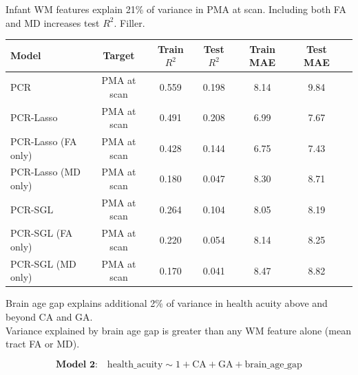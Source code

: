 \documentclass[final]{beamer}
\newlength{\colwidth}
\begin{document}
\begin{frame}[t]
\begin{columns}[t]
\begin{column}{\colwidth}
\begin{block}{Infant WM features explain 21\% of variance in PMA at scan. Including both FA and MD increases test $R^2$.}
    Filler. 
    \begin{table}[ht]
      \centering
      \fontsize{9}{11}\selectfont
      \begin{tabularx}{\textwidth}{l c c c c c c}
        \toprule
        \textbf{Model} & \textbf{Target} & \textbf{Train $R^2$} & \textbf{Test $R^2$} & \textbf{Train MAE} &
        \textbf{Test MAE} \\
        \midrule
         PCR & PMA at scan & 0.559 & 0.198 & 8.14 & 9.84 \\
        \midrule
        \rowcolor{yellow!50} PCR-Lasso & PMA at scan & 0.491 & 0.208 & 6.99 & 7.67 \\
        PCR-Lasso (FA only) & PMA at scan & 0.428 & 0.144 & 6.75 & 7.43 \\
        PCR-Lasso (MD only) & PMA at scan & 0.180 & 0.047 & 8.30 & 8.71 \\
        \midrule
        \rowcolor{yellow!50} PCR-SGL & PMA at scan & 0.264 & 0.104 & 8.05 & 8.19 \\
        PCR-SGL (FA only) & PMA at scan & 0.220 & 0.054 & 8.14 & 8.25 \\
        PCR-SGL (MD only) & PMA at scan & 0.170 & 0.041 & 8.47 & 8.82 \\
        \bottomrule
      \end{tabularx}
    \end{table}
  \end{block}

  \vspace{-15pt}
  
  \begin{block}{Brain age gap explains additional 2\% of variance in health acuity above and beyond CA and GA. \\ Variance explained by brain age gap is greater than any WM feature alone (mean tract FA or MD).}
  
    \vspace{-25pt}

    \[    
    \textbf{Model 2:} \quad \mathrm{health\_acuity} \sim \mathrm{1} + \mathrm{CA} + \mathrm{GA} + \mathrm{brain\_age\_gap}
    \]

    \vspace{-15pt}


\end{block}
\end{column}
\end{columns}
\end{frame}
\end{document}
